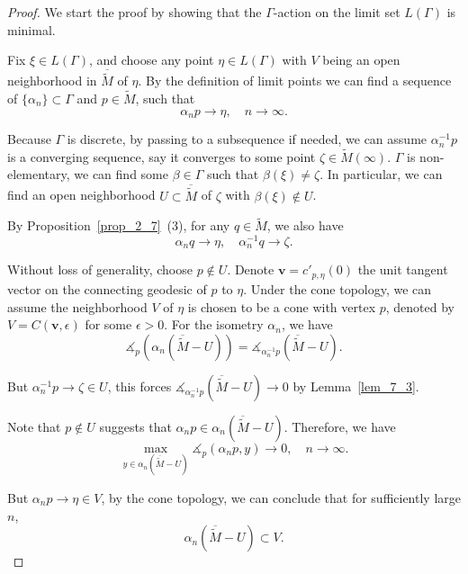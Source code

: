 \documentclass[reqno,11pt]{article}
\theoremstyle{definition}
\theoremstyle{remark}
\numberwithin{equation}{section}
\begin{document}
\begin{proof}
	We start the proof by showing that the $\Gamma$-action on the limit set $L(\Gamma)$ is minimal.

	Fix $\xi\in L(\Gamma)$, and choose any point $\eta\in L(\Gamma)$ with $V$ being an open neighborhood in $\overline{\widetilde{M}}$ of $\eta$. By the definition of limit points we can find a sequence of $\{\alpha_n\}\subset\Gamma$ and $p\in\widetilde{M}$, such that
	\begin{displaymath}
		\alpha_n p\to\eta,\quad n\to\infty.
	\end{displaymath}

	Because $\Gamma$ is discrete, by passing to a subsequence if needed, we can assume $\alpha_n^{-1}p$ is a converging sequence, say it converges to some point $\zeta\in\widetilde{M}(\infty)$. $\Gamma$ is non-elementary, we can find some $\beta\in\Gamma$ such that $\beta(\xi)\neq\zeta$. In particular, we can find an open neighborhood $U\subset\overline{\widetilde{M}}$ of $\zeta$ with $\beta(\xi)\notin U$.

	By Proposition~\ref{prop_2_7}~(3), for any $q\in\widetilde{M}$, we also have
	\begin{displaymath}
    \alpha_n q\to\eta,\quad \alpha_n^{-1} q\to\zeta.
	\end{displaymath}

	Without loss of generality, choose $p\notin U$. Denote $\bm{v}=c'_{p,\eta}(0)$ the unit tangent vector on the connecting geodesic of $p$ to $\eta$. Under the cone topology, we can assume the neighborhood $V$ of $\eta$ is chosen to be a cone with vertex $p$, denoted by $V=C(\bm{v},\epsilon)$ for some $\epsilon>0$. For the isometry $\alpha_n$, we have
	\begin{displaymath}
		\measuredangle_p(\alpha_n(\overline{\widetilde{M}}-U))=\measuredangle_{\alpha_n^{-1}p}(\overline{\widetilde{M}}-U).
	\end{displaymath}

	But $\alpha_n^{-1}p\to\zeta\in U$, this forces $\measuredangle_{\alpha_n^{-1}p}(\overline{\widetilde{M}}-U)\to0$ by Lemma~\ref{lem_7_3}.

	Note that $p\notin U$ suggests that $\alpha_n p\in\alpha_n(\overline{\widetilde{M}}-U)$. Therefore, we have
	\begin{displaymath}
		\max_{y\in\alpha_n(\overline{\widetilde{M}}-U)}\measuredangle_p(\alpha_n p,y)\to0,\quad n\to\infty.
	\end{displaymath}

	But $\alpha_n p\to\eta\in V$, by the cone topology, we can conclude that for sufficiently large $n$,
	\begin{displaymath}
		\alpha_n(\overline{\widetilde{M}}-U)\subset V.
	\end{displaymath}


\end{proof}
\end{document}
